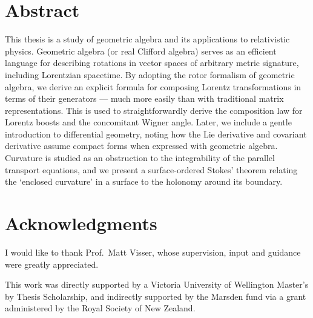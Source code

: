 \chapter*{Abstract}

This thesis is a study of geometric algebra and its applications to relativistic physics.
Geometric algebra (or real Clifford algebra) serves as an efficient language for describing rotations in vector spaces of arbitrary metric signature, including Lorentzian spacetime.
By adopting the rotor formalism of geometric algebra, we derive an explicit  formula for composing Lorentz transformations in terms of their generators --- much more easily than with traditional matrix representations.
This is used to straightforwardly derive the composition law for Lorentz boosts and the concomitant Wigner angle.
Later, we include a gentle introduction to differential geometry, noting how the Lie derivative and covariant derivative assume compact forms when expressed with geometric algebra.
Curvature is studied as an obstruction to the integrability of the parallel transport equations, and we present a surface-ordered Stokes' theorem relating the `enclosed curvature' in a surface to the holonomy around its boundary.

\chapter*{Acknowledgments}

I would like to thank Prof.\ Matt Visser, whose supervision, input and guidance were greatly appreciated.

This work was directly supported by a Victoria University of Wellington Master's by Thesis Scholarship, and indirectly supported by the Marsden fund via a grant administered by the Royal Society of New Zealand.